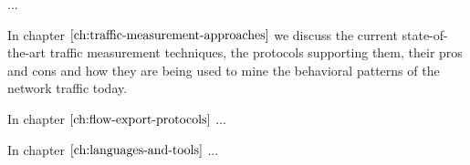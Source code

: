 ...

\vspace{50pt}

In chapter $\ref{ch:traffic-measurement-approaches}$ we discuss the current state-of-the-art traffic measurement techniques, the protocols supporting them, their pros and cons and how they are being used to mine the behavioral patterns of the network traffic today. 

In chapter $\ref{ch:flow-export-protocols}$ ...

In chapter $\ref{ch:languages-and-tools}$ ...